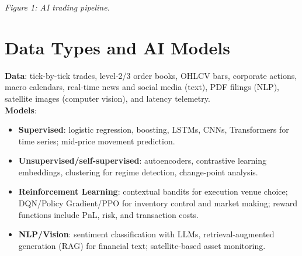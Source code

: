 \documentclass[12pt]{article}
\begin{document}
\begin{center}

\vspace{0.6cm}
\textit{Figure 1: AI trading pipeline.}
\end{center}

\section*{Data Types and AI Models}
\textbf{Data}: tick-by-tick trades, level-2/3 order books, OHLCV bars, corporate actions, macro calendars, real-time news and social media (text), PDF filings (NLP), satellite images (computer vision), and latency telemetry.\\[2pt]
\textbf{Models}:
\begin{itemize}[leftmargin=*,itemsep=2pt]
  \item \textbf{Supervised}: logistic regression, boosting, LSTMs, CNNs, Transformers for time series; mid-price movement prediction.
  \item \textbf{Unsupervised/self-supervised}: autoencoders, contrastive learning embeddings, clustering for regime detection, change-point analysis.
  \item \textbf{Reinforcement Learning}: contextual bandits for execution venue choice; DQN/Policy Gradient/PPO for inventory control and market making; reward functions include PnL, risk, and transaction costs.
  \item \textbf{NLP/Vision}: sentiment classification with LLMs, retrieval-augmented generation (RAG) for financial text; satellite-based asset monitoring.
\end{itemize}
\end{document}
